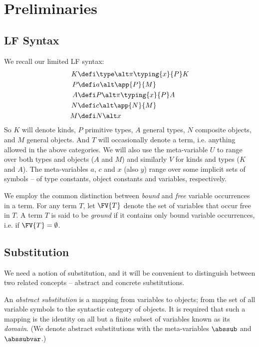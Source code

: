 \clearpage

\section*{Preliminaries}

\subsection*{LF Syntax}

We recall our limited LF syntax:
\begin{align*}
  K &\defi \type \alt \pi{\typing{x}{P}}{K} \\
  P &\defi a \alt \app{P}{M} \\
  A &\defi P \alt \pi{\typing{x}{P}}{A} \\
  N &\defi c \alt \app{N}{M} \\
  M &\defi N \alt x
\end{align*}
So $K$ will denote kinds, $P$ primitive types, $A$ general types, $N$ composite objects, and $M$ general objects.
And $T$ will occasionally denote a term, i.e. anything allowed in the above categories.
We will also use the meta-variable $U$ to range over both types and objects ($A$ and $M$) and similarly $V$ for kinds and types ($K$ and $A$).
The meta-variables $a$, $c$ and $x$ (also $y$) range over some implicit sets of symbols -- of type constants, object constants and variables, respectively.

We employ the common distinction between \emph{bound} and \emph{free} variable occurrences in a term.
For any term $T$, let $\FV{T}$ denote the set of variables that occur free in $T$.
A term $T$ is said to be \emph{ground} if it contains only bound variable occurrences, i.e. if $\FV{T} = \emptyset$.



\subsection*{Substitution}

We need a notion of substitution, and it will be convenient to distinguish between two related concepts -- abstract and concrete substitutions.

\begin{definition}
\label{def:abstract-substitution}
An \emph{abstract substitution} is a mapping from variables to objects; from the set of all variable symbols to the syntactic category of objects.
It is required that such a mapping is the identity on all but a finite subset of variables known as its \emph{domain}.
(We denote abstract substitutions with the meta-variables $\abssub$ and $\abssubvar$.)
\end{definition}


